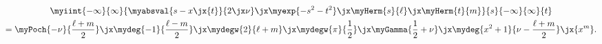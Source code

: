  \begin{multline}
      \myiint{-\infty}{\infty}
          {\myabsval{s-x\jx{t}}{2\jx\nu}\jx
          \myexp{-s^2-t^2}\jx
          \myHerm{s}{\ell}\jx
          \myHerm{t}{m}
      }
      {s}{-\infty}{\infty}{t}
    \\=
    \myPoch{-\nu}{\frac{\ell+m}{2}}\jx
    \mydeg{-1}{\frac{\ell-m}{2}}\jx
    \mydegw{2}{\ell+m}\jx
    \mydegw{\pi}{\frac{1}{2}}\jx
    \myGamma{\frac{1}{2}+\nu}\jx
    \mydeg{x^2+1}{\nu-\frac{\ell+m}{2}}\jx
    {x^m}
    .
    \label{eqn:corHermite}
\end{multline}
